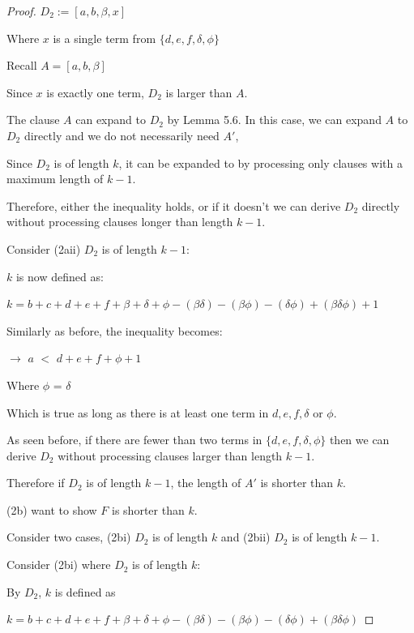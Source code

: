 \documentclass[manuscript]{acmart}
\begin{document}
\begin{proof}
        $D_2 := [a, b, \beta, x]$

        Where $x$ is a single term from $\{d, e, f, \delta, \phi\}$
        
        Recall $A = [a, b, \beta]$

        Since $x$ is exactly one term, $D_2$ is larger than $A$.

        The clause $A$ can expand to $D_2$ by Lemma 5.6. In this case, 
        we can expand $A$ to $D_2$ directly and we do not necessarily 
        need $A'$,
        
        Since $D_2$ is of length $k$, it can be expanded to by processing
        only clauses with a maximum length of $k-1$.

        Therefore, either the inequality holds, or if it doesn't we can
        derive $D_2$ directly without processing clauses longer than length $k-1$.

        Consider (2aii) $D_2$ is of length $k - 1$:

        $k$ is now defined as:

        $k = b + c + d + e + f + \beta + \delta + \phi - (\beta \delta) 
        - (\beta \phi) - (\delta \phi) + (\beta \delta \phi) + 1$

        Similarly as before, the inequality becomes:

        $\rightarrow$ $a$ $<$ $d + e + f + \phi + 1$

        Where $\phi$ = $\delta$

        Which is true as long as there is at least one term in
        $d, e, f, \delta$ or $\phi$.

        As seen before, if there are fewer than two terms in
        $\{d, e, f, \delta, \phi\}$ then we can derive $D_2$ without
        processing clauses larger than length $k-1$.

        Therefore if $D_2$ is of length $k - 1$, the length of $A'$ is 
        shorter than $k$.
        
        (2b) want to show $F$ is shorter than $k$.

        Consider two cases, (2bi) $D_2$ is of length $k$ and 
        (2bii) $D_2$ is of length $k - 1$.

        Consider (2bi) where $D_2$ is of length $k$:
        
        By $D_2$, $k$ is defined as 

        $k = b + c + d + e + f + \beta + \delta + \phi - (\beta \delta) 
        - (\beta \phi) - (\delta \phi) + (\beta \delta \phi)$


\end{proof}
\end{document}
